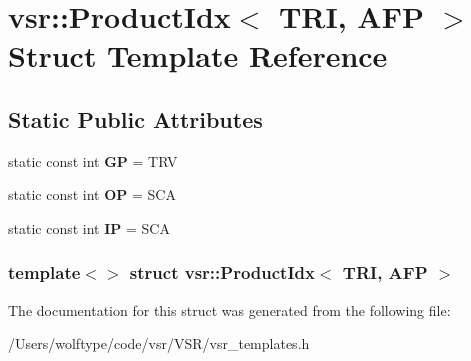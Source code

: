 \hypertarget{structvsr_1_1_product_idx_3_01_t_r_i_00_01_a_f_p_01_4}{\section{vsr\-:\-:Product\-Idx$<$ T\-R\-I, A\-F\-P $>$ Struct Template Reference}
\label{structvsr_1_1_product_idx_3_01_t_r_i_00_01_a_f_p_01_4}
}
\subsection*{Static Public Attributes}
\begin{DoxyCompactItemize}
\item 
\hypertarget{structvsr_1_1_product_idx_3_01_t_r_i_00_01_a_f_p_01_4_a5872bdcb4e84529a02bf12d19fe7b6c4}{static const int {\bfseries G\-P} = T\-R\-V}\label{structvsr_1_1_product_idx_3_01_t_r_i_00_01_a_f_p_01_4_a5872bdcb4e84529a02bf12d19fe7b6c4}

\item 
\hypertarget{structvsr_1_1_product_idx_3_01_t_r_i_00_01_a_f_p_01_4_abd5cd433501ed6a6e114003f0ed2366e}{static const int {\bfseries O\-P} = S\-C\-A}\label{structvsr_1_1_product_idx_3_01_t_r_i_00_01_a_f_p_01_4_abd5cd433501ed6a6e114003f0ed2366e}

\item 
\hypertarget{structvsr_1_1_product_idx_3_01_t_r_i_00_01_a_f_p_01_4_a75ad1fc706041b92a018d80705caf836}{static const int {\bfseries I\-P} = S\-C\-A}\label{structvsr_1_1_product_idx_3_01_t_r_i_00_01_a_f_p_01_4_a75ad1fc706041b92a018d80705caf836}

\end{DoxyCompactItemize}
\subsubsection*{template$<$$>$ struct vsr\-::\-Product\-Idx$<$ T\-R\-I, A\-F\-P $>$}



The documentation for this struct was generated from the following file\-:\begin{DoxyCompactItemize}
\item 
/\-Users/wolftype/code/vsr/\-V\-S\-R/vsr\-\_\-templates.\-h\end{DoxyCompactItemize}
